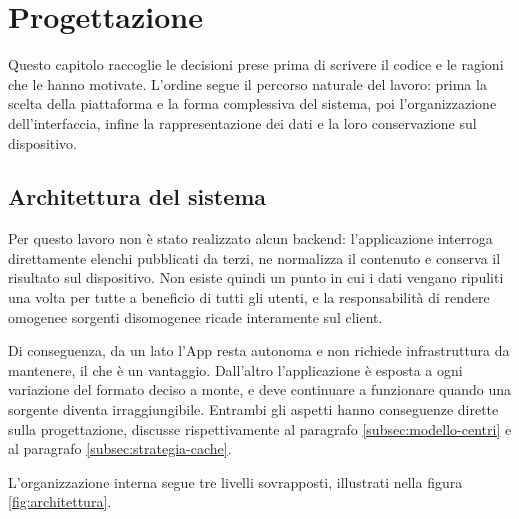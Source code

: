 \chapter{Progettazione}\label{ch:progettazione}

Questo capitolo raccoglie le decisioni prese prima di scrivere il codice e le ragioni che le hanno motivate.
L'ordine segue il percorso naturale del lavoro: prima la scelta della piattaforma e la forma complessiva del sistema,
poi l'organizzazione dell'interfaccia, infine la rappresentazione dei dati e la loro conservazione sul dispositivo.

\section{Architettura del sistema}\label{sec:architettura-sistema}

Per questo lavoro non è stato realizzato alcun backend: l'applicazione interroga direttamente elenchi pubblicati da terzi,
ne normalizza il contenuto e conserva il risultato sul dispositivo.
Non esiste quindi un punto in cui i dati vengano ripuliti una volta per tutte a beneficio di tutti gli utenti, e la responsabilità
di rendere omogenee sorgenti disomogenee ricade interamente sul client.

Di conseguenza, da un lato l'App resta autonoma e non richiede infrastruttura da mantenere, il che è un vantaggio.
Dall'altro l'applicazione è esposta a ogni variazione del formato deciso a monte, e deve continuare a funzionare quando una sorgente
diventa irraggiungibile.
Entrambi gli aspetti hanno conseguenze dirette sulla progettazione, discusse rispettivamente al paragrafo \ref{subsec:modello-centri} e al
paragrafo \ref{subsec:strategia-cache}.

L'organizzazione interna segue tre livelli sovrapposti, illustrati nella figura \ref{fig:architettura}.

